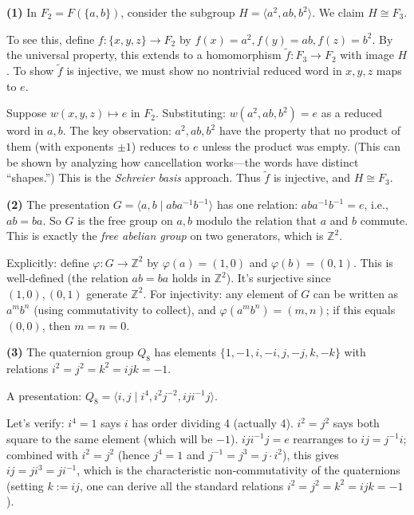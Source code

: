 \documentclass{report}
\begin{document}
\begin{solution}
\textbf{(1)} In \(F_2 = F(\{a, b\})\), consider the subgroup \(H = \langle a^2, ab, b^2 \rangle\). We claim \(H \cong F_3\).

To see this, define \(f : \{x, y, z\} \to F_2\) by \(f(x) = a^2, f(y) = ab, f(z) = b^2\). By the universal property, this extends to a homomorphism \(\tilde{f} : F_3 \to F_2\) with image \(H\). To show \(\tilde{f}\) is injective, we must show no nontrivial reduced word in \(x, y, z\) maps to \(e\).

Suppose \(w(x, y, z) \mapsto e\) in \(F_2\). Substituting: \(w(a^2, ab, b^2) = e\) as a reduced word in \(a, b\). The key observation: \(a^2, ab, b^2\) have the property that no product of them (with exponents \(\pm 1\)) reduces to \(e\) unless the product was empty. (This can be shown by analyzing how cancellation works---the words have distinct ``shapes.'') This is the \emph{Schreier basis} approach. Thus \(\tilde{f}\) is injective, and \(H \cong F_3\).

\textbf{(2)} The presentation \(G = \langle a, b \mid aba^{-1}b^{-1} \rangle\) has one relation: \(aba^{-1}b^{-1} = e\), i.e., \(ab = ba\). So \(G\) is the free group on \(a, b\) modulo the relation that \(a\) and \(b\) commute. This is exactly the \emph{free abelian group} on two generators, which is \(\mathbb{Z}^2\).

Explicitly: define \(\varphi : G \to \mathbb{Z}^2\) by \(\varphi(a) = (1, 0)\) and \(\varphi(b) = (0, 1)\). This is well-defined (the relation \(ab = ba\) holds in \(\mathbb{Z}^2\)). It's surjective since \((1,0), (0,1)\) generate \(\mathbb{Z}^2\). For injectivity: any element of \(G\) can be written as \(a^m b^n\) (using commutativity to collect), and \(\varphi(a^m b^n) = (m, n)\); if this equals \((0,0)\), then \(m = n = 0\).

\textbf{(3)} The quaternion group \(Q_8\) has elements \(\{1, -1, i, -i, j, -j, k, -k\}\) with relations \(i^2 = j^2 = k^2 = ijk = -1\).

A presentation: \(Q_8 = \langle i, j \mid i^4, i^2 j^{-2}, iji^{-1}j \rangle\).

Let's verify: \(i^4 = 1\) says \(i\) has order dividing 4 (actually 4). \(i^2 = j^2\) says both square to the same element (which will be \(-1\)). \(iji^{-1}j = e\) rearranges to \(ij = j^{-1}i\); combined with \(i^2 = j^2\) (hence \(j^4 = 1\) and \(j^{-1} = j^3 = j \cdot i^2\)), this gives \(ij = ji^3 = ji^{-1}\), which is the characteristic non-commutativity of the quaternions (setting \(k := ij\), one can derive all the standard relations \(i^2 = j^2 = k^2 = ijk = -1\)).


\end{solution}
\end{document}
